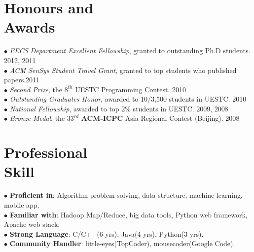 \documentclass[margin, centered]{resume}
\begin{document}
\begin{resume}
    \section{\mysidestyle Honours and\\Awards} 

    $\bullet$ \textsl{EECS Department Excellent Fellowship}, granted to outstanding Ph.D students. \hfill 2012, 2011\vspace{0mm}\\%
    $\bullet$ \textsl{ACM SenSys Student Travel Grant}, granted to top students who published papers.\hfill 2011\vspace{0mm}\\%
    $\bullet$ \textsl{Second Prize}, the $8^{th}$ UESTC Programming Contest. \hfill 2010\vspace{0mm}\\%
    $\bullet$ \textsl{Outstanding Graduates Honor}, awarded to 10/3,500 students in UESTC. \hfill 2010\vspace{0mm}\\%
    $\bullet$ \textsl{National Fellowship}, awarded to top 2\% students in UESTC. \hfill 2009, 2008\vspace{0mm}\\%
    $\bullet$ \textsl{Bronze Medal}, the $33^{rd}$ \textbf{ACM-ICPC} Asia Regional Contest (Beijing). \hfill 2008\vspace{-2mm}\\ 

    \section{\mysidestyle Professional \\Skill} 
	
	$\bullet$ \textbf{Proficient in}: Algorithm problem solving, data structure, machine learning, mobile app.\vspace{0mm}\\
	$\bullet$ \textbf{Familiar with}: Hadoop Map/Reduce, big data tools, Python web framework, Apache web stack.\vspace{0mm}\\
    $\bullet$ \textbf{Strong Language}: C/C++(6 yrs), Java(4 yrs), Python(3 yrs).\vspace{0mm}\\
	$\bullet$ \textbf{Community Handler}: little-eyes(TopCoder), mousecoder(Google Code).\vspace{-2mm}\\


\end{resume}
\end{document}
